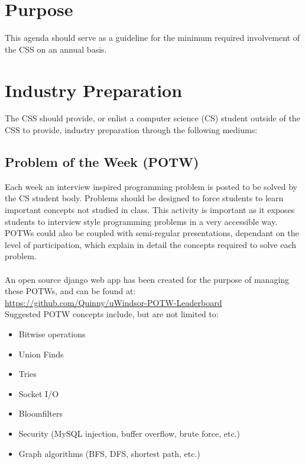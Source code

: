 \documentclass[12pt]{article}
\begin{document}
\maketitle

\tableofcontents

\pagebreak

\section{Purpose}
This agenda should serve as a guideline for the minimum required involvement of 
the CSS on an annual basis.

\section{Industry Preparation}
The CSS should provide, or enlist a computer science (CS) student outside of the CSS
to provide, industry preparation through the following mediums:

\subsection{Problem of the Week (POTW)}
Each week an interview inspired programming problem is posted to be solved by the
CS student body.  Problems should be designed to force students to learn important
concepts not studied in class.  This activity is important as it exposes students
to interview style programming problems in a very accessible way.  POTWs could
also be coupled with semi-regular presentations, dependant on the level of
participation, which explain in detail the concepts required to solve each problem.
\\ \\
An open source django web app has been created for the purpose of managing these POTWs,
and can be found at: \\
\url{https://github.com/Quinny/uWindsor-POTW-Leaderboard}
\\
Suggested POTW concepts include, but are not limited to:
\begin{itemize}
  \item Bitwise operations
  \item Union Finds
  \item Tries
  \item Socket I/O
  \item Bloomfilters
  \item Security (MySQL injection, buffer overflow, brute force, etc.)
  \item Graph algorithms (BFS, DFS, shortest path, etc.)
\end{itemize}
\end{document}
